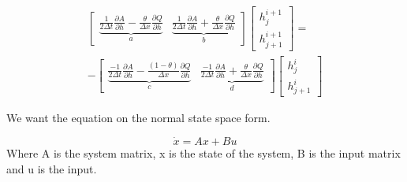 \begin{equation}
\begin{aligned}
	\begin{bmatrix}
		\underbrace{\frac{1}{2\Delta t}\frac{\partial A}{\partial h}-\frac{\theta}{\Delta x}\frac{\partial Q}{\partial h}}_{a}  & \underbrace{\frac{1}{2\Delta t}\frac{\partial A}{\partial h}+\frac{\theta}{\Delta x}\frac{\partial Q}{\partial h}}_{b} 
	\end{bmatrix}
	\begin{bmatrix}
		h_{j}^{i+1} \\
		h_{j+1}^{i+1}
	\end{bmatrix}
	= \\ -
	\begin{bmatrix}
		\underbrace{\frac{-1}{2\Delta t}\frac{\partial A}{\partial h}-\frac{(1-\theta)}{\Delta x}\frac{\partial Q}{\partial h}}_{c} & \underbrace{\frac{-1}{2\Delta t}\frac{\partial A}{\partial h}+\frac{\theta}{\Delta x}\frac{\partial Q}{\partial h}}_{d} 
	\end{bmatrix}
	\begin{bmatrix}
		h_{j}^{i} \\
		h_{j+1}^{i}
	\end{bmatrix}
	\end{aligned}
\end{equation}

We want the equation on the normal state space form.

\begin{equation}
	\dot{x} = Ax + Bu
\end{equation}
Where A is the system matrix, x is the state of the system, B is the input matrix and u is the input. 

